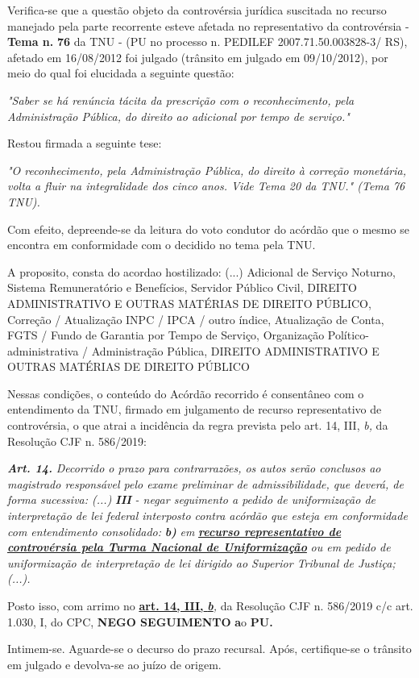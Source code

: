\documentclass[12pt]{article}
\begin{document}
\justifying
\noindent Verifica-se que a questão objeto da controvérsia jurídica suscitada no recurso manejado pela parte recorrente esteve afetada no representativo da controvérsia - \textbf{Tema n. }\textbf{76} da TNU - (PU no processo n. PEDILEF 2007.71.50.003828-3/ RS),  afetado em 16/08/2012 foi julgado (trânsito em julgado em 09/10/2012), por meio do qual foi elucidada a seguinte questão:

\noindent \textit{"Saber se há renúncia tácita da prescrição com o reconhecimento, pela Administração Pública, do direito ao adicional por tempo de serviço."}

\noindent Restou firmada a seguinte tese:

\noindent \textit{"O reconhecimento, pela Administração Pública, do direito à correção monetária, volta a fluir na integralidade dos cinco anos. Vide Tema 20 da TNU." (Tema 76 TNU).}

\noindent Com efeito, depreende-se da leitura do voto condutor do acórdão que o mesmo se encontra em conformidade com o decidido no  tema pela TNU.

\noindent A proposito, consta do acordao hostilizado: (...) Adicional de Serviço Noturno, Sistema Remuneratório e Benefícios, Servidor Público Civil, DIREITO ADMINISTRATIVO E OUTRAS MATÉRIAS DE DIREITO PÚBLICO, Correção / Atualização INPC / IPCA / outro índice, Atualização de Conta, FGTS / Fundo de Garantia por Tempo de Serviço, Organização Político-administrativa / Administração Pública, DIREITO ADMINISTRATIVO E OUTRAS MATÉRIAS DE DIREITO PÚBLICO

\noindent Nessas condições, o conteúdo do Acórdão recorrido é consentâneo com o entendimento da TNU, firmado em julgamento de recurso representativo de controvérsia, o que atrai a incidência da regra prevista pelo art. 14, III, \textit{b,} da Resolução CJF n. 586/2019:

\noindent \textit{\textbf{Art. 14.}}\textit{ Decorrido o prazo para contrarrazões, os autos serão conclusos ao magistrado responsável pelo exame preliminar de admissibilidade, que deverá, de forma sucessiva: (...) }\textit{\textbf{III }}\textit{- negar seguimento a pedido de uniformização de interpretação de lei federal interposto contra acórdão que esteja em conformidade com entendimento consolidado: }\textit{\textbf{b)}}\textit{ em }\uline{\textit{\textbf{recurso representativo de controvérsia pela Turma Nacional de Uniformização}}}\textit{ ou em pedido de uniformização de interpretação de lei dirigido ao Superior Tribunal de Justiça;(...).}

\noindent Posto isso, com arrimo no \uline{\textbf{art. 14, III, }}\uline{\textit{\textbf{b}}}\textit{,} da Resolução CJF n. 586/2019 c/c art. 1.030, I, do CPC, \textbf{NEGO SEGUIMENTO }\textbf{a}o\textbf{ PU}\textbf{.}

\noindent Intimem-se. Aguarde-se o decurso do prazo recursal. Após, certifique-se o trânsito em julgado e devolva-se ao juízo de origem.
\end{document}
